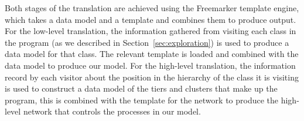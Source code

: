 \documentclass[10pt,a4paper]{article}
\begin{document}
Both stages of the translation are achieved using the Freemarker template engine, which takes a data model and a template and combines them to produce output. For the low-level translation, the information gathered from visiting each class in the program (as we described in Section~\ref{sec:exploration}) is used to produce a data model for that class. The relevant template is loaded and combined with the data model to produce our model. For the high-level translation, the information record by each visitor about the position in the hierarchy of the class it is visiting is used to construct a data model of the tiers and clusters that make up the program, this is combined with the template for the network to produce the high-level network that controls the processes in our model.
\end{document}
